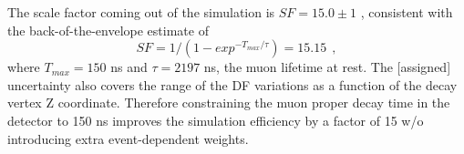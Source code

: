 The scale factor coming out of the simulation is $SF = 15.0 \pm 1$ , consistent with the back-of-the-envelope
estimate of
$$
            SF = 1/(1 - exp^{-T_{max}/\tau}) = 15.15 ~~,
$$
where $T_{max} = 150$ ns and $\tau = 2197$ ns, the muon lifetime at rest. The [assigned] uncertainty also covers
the  range of the DF variations as a function of the decay vertex Z coordinate.
Therefore constraining the muon proper decay time in the detector to 150 ns improves the simulation efficiency
by a factor of 15 w/o introducing extra event-dependent weights.

